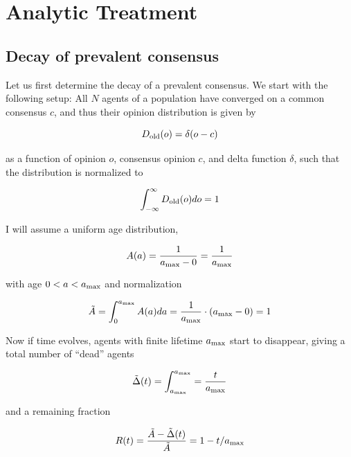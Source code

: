 \documentclass[useAMS,usenatbib]{mn2e}
\begin{document}
\section{Analytic Treatment}
\label{sec:analytic}

\subsection{Decay of prevalent consensus}
Let us first determine the decay of a prevalent consensus. We start
with the following setup: All $N$ agents of a population have converged on
a common consensus $c$, and thus their opinion distribution is given
by

\begin{equation}
    \label{eq:opiniondistribution_consensus}
    D_{\rm old}(o)=\delta(o-c)
\end{equation}

as a function of opinion $o$, consensus opinion $c$, and delta
function $\delta$, such that the distribution is normalized to

\begin{equation}
    \label{eq:opiniondistribution_consensus_normalization}
    \int_{-\infty}^{\infty} D_{\rm old}(o) do = 1
\end{equation}

I will assume a uniform age distribution,

\begin{equation}
    \label{eq:agedistribution}
    A(a) = \frac{1}{a_{\rm max}-0} = \frac{1}{a_{\rm max}}
\end{equation}

with age $0<a<a_{\rm max}$ and normalization

\begin{equation}
    \label{eq:agedistribution_normalization}
    \tilde{A} = \int_0^{a_{\rm max}} A(a) da = \frac{1}{a_{\rm max}} \cdot (a_{\rm max}-0) = 1
\end{equation}

Now if time evolves, agents with finite lifetime $a_{\rm max}$ start
to disappear, giving a total number of ``dead'' agents

\begin{equation}
    \tilde{\Delta}(t) = \int_{a_{\rm max}}^{a_{\rm max}} = \frac{t}{a_{\rm max}}
\end{equation}

and a remaining fraction

\begin{equation}
    R(t) = \frac{\tilde{A}-\tilde{\Delta}(t)}{\tilde{A}} = 1-t/a_{\rm max}
\end{equation}
\end{document}
